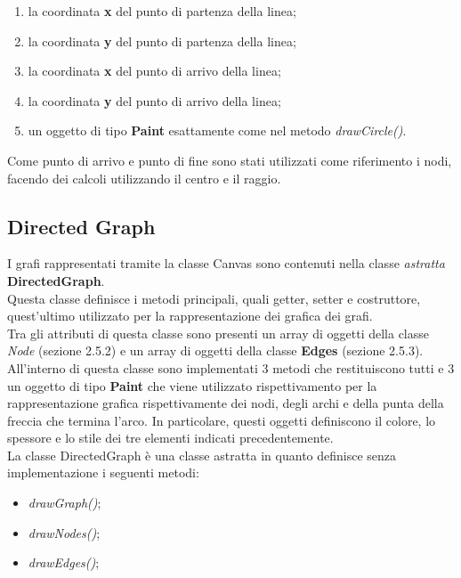 \documentclass[a4paper,11pt,twoside,openright]{report}
\begin{document}
\begin{enumerate}
\item la coordinata \textbf{x} del punto di partenza della linea;

\item la coordinata \textbf{y} del punto di partenza della linea;

\item la coordinata \textbf{x} del punto di arrivo della linea;

\item la coordinata \textbf{y} del punto di arrivo della linea;

\item un oggetto di tipo \textbf{Paint} esattamente come nel metodo \textit{drawCircle()}.
\end{enumerate}

Come punto di arrivo e punto di fine sono stati utilizzati come riferimento i nodi, facendo dei calcoli utilizzando il centro e il raggio.

\subsection{Directed Graph}
I grafi rappresentati tramite la classe Canvas sono contenuti nella classe \textit{astratta} \textbf{DirectedGraph}.\\
Questa classe definisce i metodi principali, quali getter, setter e costruttore, quest'ultimo utilizzato per la rappresentazione dei grafica dei grafi.\\
Tra gli attributi di questa classe sono presenti un array di oggetti della classe \textit{Node} (sezione 2.5.2)  e un array di oggetti della classe \textbf{Edges} (sezione 2.5.3).
All'interno di questa classe sono implementati 3 metodi che restituiscono tutti e 3 un oggetto di tipo \textbf{Paint} che viene utilizzato rispettivamento per la rappresentazione grafica rispettivamente dei nodi, degli archi e della punta della freccia che termina l'arco. In particolare, questi oggetti definiscono il colore, lo spessore e lo stile dei tre elementi indicati precedentemente.\\
La classe DirectedGraph è una classe astratta in quanto definisce senza implementazione i seguenti metodi:

\begin{itemize}
\item \textit{drawGraph()};

\item \textit{drawNodes()};

\item \textit{drawEdges()};
\end{itemize}
\end{document}
